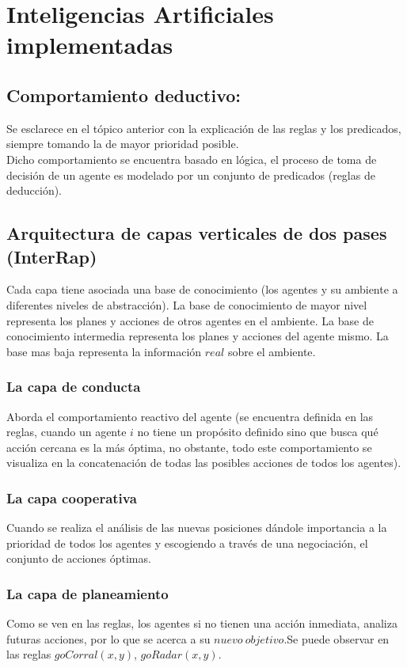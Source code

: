 \documentclass{book}
\begin{document}
	\section{Inteligencias Artificiales implementadas}
	
	\subsection{Comportamiento deductivo:}
	Se esclarece en el t\'opico anterior con la explicaci\'on de las reglas y los predicados, siempre tomando la de mayor prioridad posible. \\
	Dicho comportamiento se encuentra basado en l\'ogica, el proceso de toma de decisi\'on de un agente es modelado por un conjunto de predicados (reglas de deducci\'on).
	
	\subsection{Arquitectura de capas verticales de dos pases (InterRap)}
		Cada capa tiene asociada una base de conocimiento (los agentes y su ambiente a diferentes niveles de abstracci\'on).
		La base de conocimiento de mayor nivel representa los planes y acciones de otros agentes en el ambiente. La base de conocimiento intermedia representa los planes y acciones del agente mismo. La base mas baja representa la informaci\'on $real$ sobre el ambiente.
			
		\subsubsection{La capa de conducta}
		
	 		Aborda el comportamiento reactivo del agente (se encuentra definida en las reglas, cuando un agente $i$ no tiene un prop\'osito definido sino que busca qu\'e acci\'on cercana es la m\'as \'optima, no obstante, todo este comportamiento se visualiza en la concatenaci\'on de todas las posibles acciones de todos los agentes).
	 	\subsubsection{La capa cooperativa}
	 		Cuando se realiza el an\'alisis de las nuevas posiciones d\'andole importancia a la prioridad de todos los agentes y escogiendo a trav\'es de una negociaci\'on, el conjunto de acciones \'optimas.
	 	\subsubsection{La capa de planeamiento}
	 		Como se ven en las reglas, los agentes si no tienen una acci\'on inmediata, analiza futuras acciones, por lo que se acerca a su $nuevo \ objetivo$.Se puede observar en las reglas $goCorral(x,y)$,  $goRadar(x,y)$.
\end{document}
